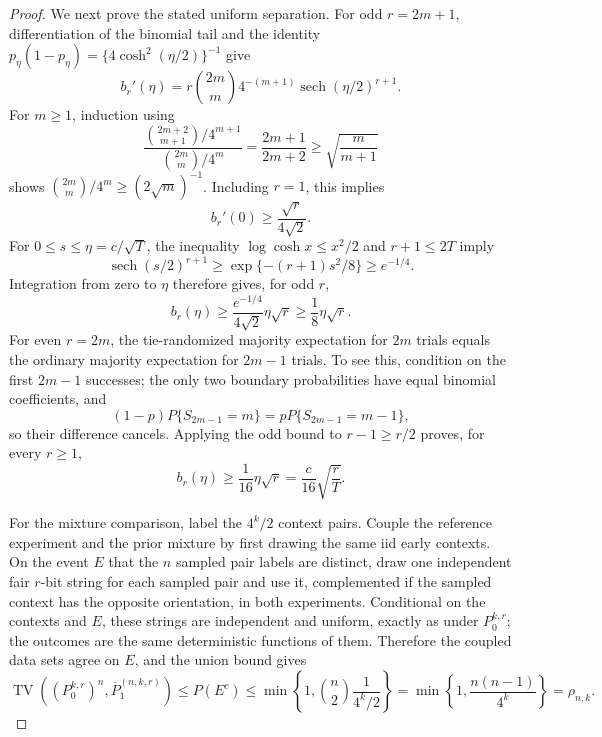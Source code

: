 \documentclass{article}
\begin{document}
\begin{proof}
We next prove the stated uniform separation.  For odd \(r=2m+1\), differentiation of the binomial tail and the identity \(p_\eta(1-p_\eta)=\{4\cosh^2(\eta/2)\}^{-1}\) give
\[
 b_r'(\eta)
 =r\binom{2m}{m}4^{-(m+1)}\operatorname{sech}(\eta/2)^{r+1}.
\]
For \(m\geq1\), induction using
\[
 \frac{\binom{2m+2}{m+1}/4^{m+1}}{\binom{2m}{m}/4^m}
 =\frac{2m+1}{2m+2}\geq\sqrt{\frac m{m+1}}
\]
shows \(\binom{2m}{m}/4^m\geq(2\sqrt m)^{-1}\).  Including \(r=1\), this implies
\[
 b_r'(0)\geq\frac{\sqrt r}{4\sqrt2}.
\]
For \(0\leq s\leq\eta=c/\sqrt T\), the inequality \(\log\cosh x\leq x^2/2\) and \(r+1\leq2T\) imply
\[
 \operatorname{sech}(s/2)^{r+1}
 \geq\exp\{-(r+1)s^2/8\}\geq e^{-1/4}.
\]
Integration from zero to \(\eta\) therefore gives, for odd \(r\),
\[
 b_r(\eta)\geq \frac{e^{-1/4}}{4\sqrt2}\eta\sqrt r\geq\frac18\eta\sqrt r.
\]
For even \(r=2m\), the tie-randomized majority expectation for \(2m\) trials equals the ordinary majority expectation for \(2m-1\) trials.  To see this, condition on the first \(2m-1\) successes; the only two boundary probabilities have equal binomial coefficients, and
\[
 (1-p)P\{S_{2m-1}=m\}=pP\{S_{2m-1}=m-1\},
\]
so their difference cancels.  Applying the odd bound to \(r-1\geq r/2\) proves, for every \(r\geq1\),
\[
 b_r(\eta)\geq\frac1{16}\eta\sqrt r
 =\frac c{16}\sqrt{\frac rT}.
\]

For the mixture comparison, label the \(4^k/2\) context pairs.  Couple the reference experiment and the prior mixture by first drawing the same iid early contexts.  On the event \(E\) that the \(n\) sampled pair labels are distinct, draw one independent fair \(r\)-bit string for each sampled pair and use it, complemented if the sampled context has the opposite orientation, in both experiments.  Conditional on the contexts and \(E\), these strings are independent and uniform, exactly as under \(P_0^{k,r}\); the outcomes are the same deterministic functions of them.  Therefore the coupled data sets agree on \(E\), and the union bound gives
\[
 \operatorname{TV}((P_0^{k,r})^n,\overline P_1^{(n,k,r)})
 \leq P(E^c)
 \leq\min\left\{1,\binom n2\frac{1}{4^k/2}\right\}
 =\min\left\{1,\frac{n(n-1)}{4^k}\right\}
 =\rho_{n,k}.
\]


\end{proof}
\end{document}
